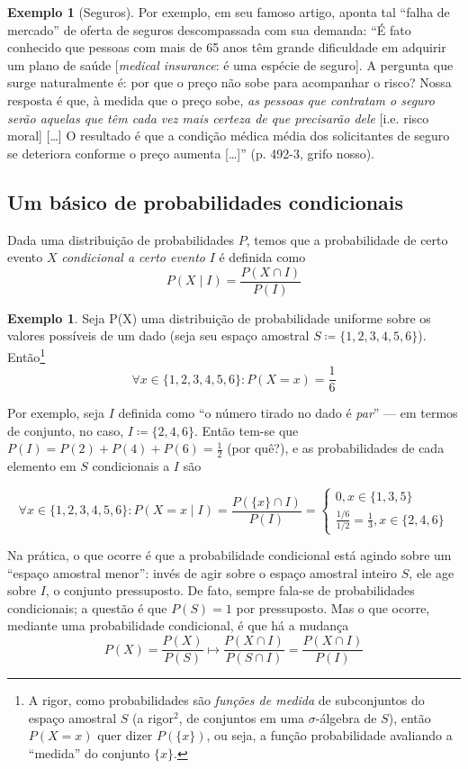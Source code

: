 \documentclass[12pt]{article}
\numberwithin{equation}{section}
\theoremstyle{plain}
\theoremstyle{definition}
\newtheorem{example}[theorem]{Exemplo}
\theoremstyle{remark}
\begin{document}
\begin{example}[Seguros]
{      Por exemplo, em seu famoso artigo, \textcite{Akerlof1978} aponta tal ``falha de mercado'' de oferta de seguros descompassada com sua demanda: ``É fato conhecido que pessoas com mais de 65 anos têm grande dificuldade em adquirir um plano de saúde [\textit{medical insurance}: é uma espécie de seguro]. A pergunta que surge naturalmente é: por que o preço não sobe para acompanhar o risco? Nossa resposta é que, à medida que o preço sobe, \textit{as pessoas que contratam o seguro serão aquelas que têm cada vez mais certeza de que precisarão dele} [i.e. risco moral] […] O resultado é que a condição médica média dos solicitantes de seguro se deteriora conforme o preço aumenta […]'' (p. 492-3, grifo nosso).}
\end{example}
  
\subsection{Um básico de probabilidades condicionais}
Dada uma distribuição de probabilidades $P$, temos que a probabilidade de certo evento $X$ \textit{condicional a certo evento} $I$ é definida como
\[
P(X \mid I) = \frac{P(X \cap I)}{P(I)}
\]

\begin{example}
  Seja P(X) uma distribuição de probabilidade uniforme sobre os valores possíveis de um dado (seja seu espaço amostral $S \coloneqq \{1, 2, 3, 4, 5, 6\}$). Então\footnote{A rigor, como probabilidades são \textit{funções de medida} de subconjuntos do espaço amostral $S$ (a rigor$^2$, de conjuntos em uma $\sigma$-álgebra de $S$), então $P(X=x)$ quer dizer $P(\{x\})$, ou seja, a função probabilidade avaliando a ``medida'' do conjunto $\{x\}$.}
  \[
  \forall x \in \{1, 2, 3, 4, 5, 6\}: P(X = x) = \frac{1}{6} 
  \]
  
  Por exemplo, seja $I$ definida como ``o número tirado no dado é \textit{par}'' --- em termos de conjunto, no caso, $I \coloneqq \{2, 4, 6\}$. Então tem-se que $P(I) = P(2) + P(4) + P(6) = \frac{1}{2}$ (por quê?), e as probabilidades de cada elemento em $S$ condicionais a $I$ são

  \[
  \forall x \in \{1, 2, 3, 4, 5, 6\}: P(X = x \mid I) = \frac{P(\{x\} \cap I)}{P(I)} = \begin{cases}
    0, x \in \{1, 3, 5 \} \\
    \frac{1/6}{1/2} = \frac{1}{3}, x \in \{2, 4, 6\}
  \end{cases}
  \]

  Na prática, o que ocorre é que a probabilidade condicional está agindo sobre um ``espaço amostral menor'': invés de agir sobre o espaço amostral inteiro $S$, ele age sobre $I$, o conjunto pressuposto. De fato, sempre fala-se de probabilidades condicionais; a questão é que $P(S) = 1$ por pressuposto. Mas o que ocorre, mediante uma probabilidade condicional, é que há a mudança
  \[
  P(X) = \frac{P(X)}{P(S)} \mapsto \frac{P(X \cap I)}{P(S \cap I)} = \frac{P(X \cap I)}{P(I)}
  \]
\end{example}
\end{document}
